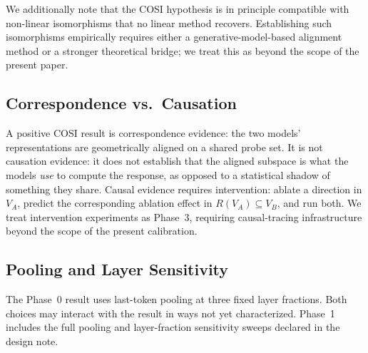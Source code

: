 We additionally note that the COSI hypothesis is in principle compatible
with non-linear isomorphisms that no linear method recovers. Establishing
such isomorphisms empirically requires either a generative-model-based
alignment method or a stronger theoretical bridge; we treat this as
beyond the scope of the present paper.

\subsection{Correspondence vs.\ Causation}

A positive COSI result is correspondence evidence: the two models'
representations are geometrically aligned on a shared probe set. It is
not causation evidence: it does not establish that the aligned subspace
is what the models \emph{use} to compute the response, as opposed to a
statistical shadow of something they share. Causal evidence requires
intervention: ablate a direction in $V_A$, predict the corresponding
ablation effect in $R(V_A) \subseteq V_B$, and run both. We treat
intervention experiments as Phase~3, requiring causal-tracing
infrastructure beyond the scope of the present calibration.

\subsection{Pooling and Layer Sensitivity}

The Phase~0 result uses last-token pooling at three fixed layer fractions.
Both choices may interact with the result in ways not yet characterized.
Phase~1 includes the full pooling and layer-fraction sensitivity sweeps
declared in the design note.
